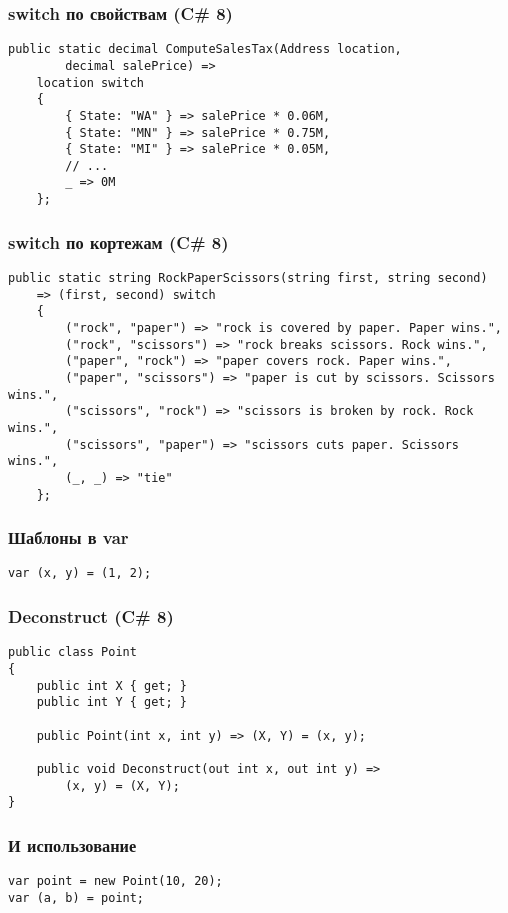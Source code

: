 \documentclass[xetex,mathserif,serif]{beamer}
\begin{document}
    \begin{frame}[fragile]
        \frametitle{switch по свойствам (C\# 8)}
        \begin{verbatim}
public static decimal ComputeSalesTax(Address location, 
        decimal salePrice) =>
    location switch
    {
        { State: "WA" } => salePrice * 0.06M,
        { State: "MN" } => salePrice * 0.75M,
        { State: "MI" } => salePrice * 0.05M,
        // ...
        _ => 0M
    };
        \end{verbatim}
    \end{frame}

    \begin{frame}[fragile]
        \frametitle{switch по кортежам (C\# 8)}
        \begin{verbatim}
public static string RockPaperScissors(string first, string second)
    => (first, second) switch
    {
        ("rock", "paper") => "rock is covered by paper. Paper wins.",
        ("rock", "scissors") => "rock breaks scissors. Rock wins.",
        ("paper", "rock") => "paper covers rock. Paper wins.",
        ("paper", "scissors") => "paper is cut by scissors. Scissors wins.",
        ("scissors", "rock") => "scissors is broken by rock. Rock wins.",
        ("scissors", "paper") => "scissors cuts paper. Scissors wins.",
        (_, _) => "tie"
    };
        \end{verbatim}
    \end{frame}

    \begin{frame}[fragile]
        \frametitle{Шаблоны в var}
        \begin{verbatim}
var (x, y) = (1, 2);
        \end{verbatim}
    \end{frame}

    \begin{frame}[fragile]
        \frametitle{Deconstruct (C\# 8)}
        \begin{verbatim}
public class Point
{
    public int X { get; }
    public int Y { get; }

    public Point(int x, int y) => (X, Y) = (x, y);

    public void Deconstruct(out int x, out int y) =>
        (x, y) = (X, Y);
}
        \end{verbatim}
    \end{frame}

    \begin{frame}[fragile]
        \frametitle{И использование}
        \begin{verbatim}
var point = new Point(10, 20);
var (a, b) = point;
        \end{verbatim}
    \end{frame}
\end{document}
